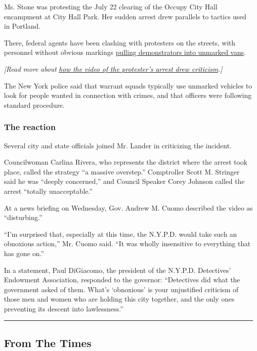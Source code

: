 Ms. Stone was protesting the July 22 clearing of the Occupy City Hall
encampment at City Hall Park. Her sudden arrest drew parallels to
tactics used in Portland.

There, federal agents have been clashing with protesters on the streets,
with personnel without obvious markings
\href{https://www.nytimes.com/2020/07/17/us/portland-protests.html}{pulling
demonstrators into unmarked vans}.

\emph{{[}Read more about}
\href{https://www.nytimes.com/2020/07/28/nyregion/nypd-protester-van.html}{\emph{how
the video of the protester's arrest drew criticism}}\emph{.{]}}

The New York police said that warrant squads typically use unmarked
vehicles to look for people wanted in connection with crimes, and that
officers were following standard procedure.

\hypertarget{the-reaction}{%
\subsubsection{The reaction}\label{the-reaction}}

Several city and state officials joined Mr. Lander in criticizing the
incident.

Councilwoman Carlina Rivera, who represents the district where the
arrest took place, called the strategy ``a massive overstep.''
Comptroller Scott M. Stringer said he was ``deeply concerned,'' and
Council Speaker Corey Johnson called the arrest ``totally
unacceptable.''

At a news briefing on Wednesday, Gov. Andrew M. Cuomo described the
video as ``disturbing.''

``I'm surprised that, especially at this time, the N.Y.P.D. would take
such an obnoxious action,'' Mr. Cuomo said. ``It was wholly insensitive
to everything that has gone on.''

In a statement, Paul DiGiacomo, the president of the N.Y.P.D.
Detectives' Endowment Association, responded to the governor:
``Detectives did what the government asked of them. What's `obnoxious'
is your unjustified criticism of those men and women who are holding
this city together, and the only ones preventing its descent into
lawlessness.''

\begin{center}\rule{0.5\linewidth}{\linethickness}\end{center}

\hypertarget{from-the-times}{%
\subsection{From The Times}\label{from-the-times}}

